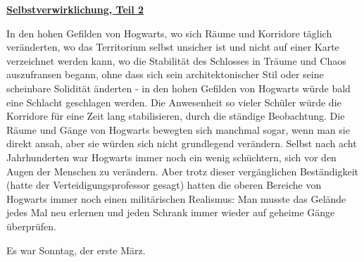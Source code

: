 

\hypertarget{selbstverwirklichung-teil-2}{%

\textbf{\uline{Selbstverwirklichung, Teil 2}}

In den hohen Gefilden von Hogwarts, wo sich Räume und Korridore täglich veränderten, wo das Territorium selbst unsicher ist und nicht auf einer Karte verzeichnet werden kann, wo die Stabilität des Schlosses in Träume und Chaos auszufransen begann, ohne dass sich sein architektonischer Stil oder seine scheinbare Solidität änderten - in den hohen Gefilden von Hogwarts würde bald eine Schlacht geschlagen werden. Die Anwesenheit so vieler Schüler würde die Korridore für eine Zeit lang stabilisieren, durch die ständige Beobachtung. Die Räume und Gänge von Hogwarts bewegten sich manchmal sogar, wenn man sie direkt ansah, aber sie würden sich nicht grundlegend verändern. Selbst nach acht Jahrhunderten war Hogwarts immer noch ein wenig schüchtern, sich vor den Augen der Menschen zu verändern. Aber trotz dieser vergänglichen Beständigkeit (hatte der Verteidigungsprofessor gesagt) hatten die oberen Bereiche von Hogwarts immer noch einen militärischen Realismus: Man musste das Gelände jedes Mal neu erlernen und jeden Schrank immer wieder auf geheime Gänge überprüfen.

Es war Sonntag, der erste März.

}
